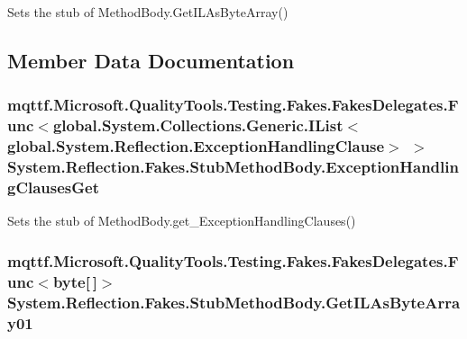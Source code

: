 Sets the stub of Method\-Body.\-Get\-I\-L\-As\-Byte\-Array()



\subsection{Member Data Documentation}
\hypertarget{class_system_1_1_reflection_1_1_fakes_1_1_stub_method_body_a3d85a2afc5d5161227237744fe474d13}{
\subsubsection[{Exception\-Handling\-Clauses\-Get}]{\setlength{\rightskip}{0pt plus 5cm}mqttf.\-Microsoft.\-Quality\-Tools.\-Testing.\-Fakes.\-Fakes\-Delegates.\-Func$<$global.\-System.\-Collections.\-Generic.\-I\-List$<$global.\-System.\-Reflection.\-Exception\-Handling\-Clause$>$ $>$ System.\-Reflection.\-Fakes.\-Stub\-Method\-Body.\-Exception\-Handling\-Clauses\-Get}}\label{class_system_1_1_reflection_1_1_fakes_1_1_stub_method_body_a3d85a2afc5d5161227237744fe474d13}


Sets the stub of Method\-Body.\-get\-\_\-\-Exception\-Handling\-Clauses()

\hypertarget{class_system_1_1_reflection_1_1_fakes_1_1_stub_method_body_a50925380d3963b2073e054fcacfa104d}{
\subsubsection[{Get\-I\-L\-As\-Byte\-Array01}]{\setlength{\rightskip}{0pt plus 5cm}mqttf.\-Microsoft.\-Quality\-Tools.\-Testing.\-Fakes.\-Fakes\-Delegates.\-Func$<$byte\mbox{[}$\,$\mbox{]}$>$ System.\-Reflection.\-Fakes.\-Stub\-Method\-Body.\-Get\-I\-L\-As\-Byte\-Array01}}\label{class_system_1_1_reflection_1_1_fakes_1_1_stub_method_body_a50925380d3963b2073e054fcacfa104d}


